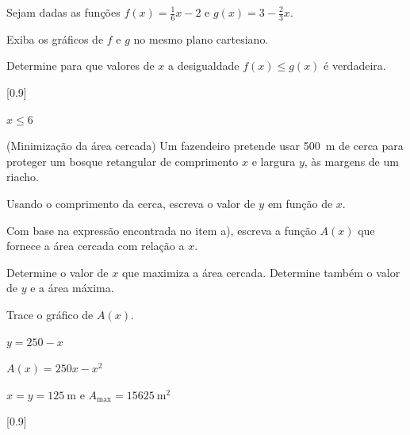 \begin{exercises*}
\begin{exercise}
  Sejam dadas as funções
  \( f(x) =   \frac{1}{6}x-2 \) e
  \( g(x) = 3-\frac{2}{3}x \).
  \begin{alphalist}
    \item Exiba os gráficos de $f$ e $g$ no mesmo plano cartesiano.
    \item Determine para que valores de $x$ a desigualdade
          $f(x) \leq g(x)$ é verdadeira.
  \end{alphalist}

  \begin{answer}
    \begin{alphalist}
    \item {}[0.9]
      \item $x \leq 6$
    \end{alphalist}
  \end{answer}
\end{exercise}

\begin{exercise}
  (Minimização da área cercada) Um fazendeiro pretende usar \SI{500}{\meter}
  de cerca para proteger um bosque retangular de comprimento $x$
  e largura $y$, às margens de um riacho.
  \begin{alphalist}
    \item Usando o comprimento da cerca, escreva o valor de $y$ em função de $x$.
    \item Com base na expressão encontrada no item a), escreva a função
          $A(x)$ que fornece a área cercada com relação a $x$.
    \item Determine o valor de $x$ que maximiza a área cercada.
          Determine também o valor de $y$ e a área máxima.
    \item Trace o gráfico de $A(x)$.
  \end{alphalist}

  \begin{answer}
    \begin{alphalist}
      \item $y = 250-x$
      \item $A(x) = 250x - x^2$
      \item $x=y=\SI{125}{\meter}$ e $A_{\text{max}} = \SI{15625}{\meter^2}$
      \item {}[0.9]
    \end{alphalist}
  \end{answer}
\end{exercise}


\end{exercises*}
